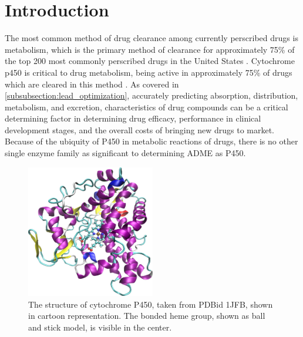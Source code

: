 \section{Introduction}
\label{section:p450/introduction}
The most common method of drug clearance among currently perscribed drugs is metabolism, which is the primary method of clearance for approximately 75\% of the top 200 most commonly perscribed drugs in the United States \cite{williams2004drug}.
Cytochrome p450 is critical to drug metabolism, being active in approximately 75\% of drugs which are cleared in this method \cite{guengerich2007cytochrome}. 
As covered in \ref{subsubsection:lead_optimization}, accurately predicting  absorption, distribution, metabolism, and excretion, characteristics of drug compounds can be a critical determining factor in determining drug efficacy, performance in clinical development stages, and the overall costs of bringing new drugs to market.
Because of the ubiquity of P450 in metabolic reactions of drugs, there is no other single enzyme family as significant to determining ADME as P450.   

\begin{figure}[h]
\centering
\includegraphics[width=0.5\textwidth]{figures/p450.png}
\caption{
The structure of cytochrome P450, taken from PDBid 1JFB, shown in cartoon representation.
The bonded heme group, shown as ball and stick model, is visible in the center.
}
\label{fig:p450}
\end{figure}

